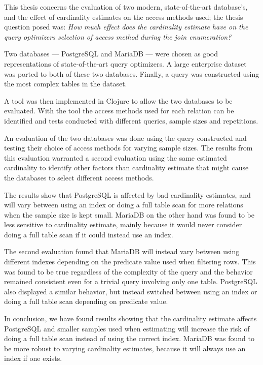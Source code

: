 This thesis concerns the evaluation of two modern, state-of-the-art database's,
and the effect of cardinality estimates on the access methods used; the thesis
question posed was:
\textit{How much effect does the cardinality estimate have on the query optimizers
  selection of access method during the join enumeration?}

Two databases --- PostgreSQL and MariaDB --- were chosen as good representations of
state-of-the-art query optimizers. A large enterprise dataset was ported to both
of these two databases. Finally, a query was constructed using the most complex
tables in the dataset.

A tool was then implemented in Clojure to allow the two databases to be
evaluated. With the tool the access methods used for each relation can be
identified and tests conducted with different queries, sample sizes and
repetitions.

An evaluation of the two databases was done using the query constructed and
testing their choice of access methods for varying sample sizes. The results
from this evaluation warranted a second evaluation using the same estimated
cardinality to identify other factors than cardinality estimate that might cause
the databases to select different access methods.

The results show that PostgreSQL is affected by bad cardinality estimates, and
will vary between using an index or doing a full table scan for more relations
when the sample size is kept small. MariaDB on the other hand was found to be
less sensitive to cardinality estimate, mainly because it would never consider
doing a full table scan if it could instead use an index.

The second evaluation found that MariaDB will instead vary between using
different indexes depending on the predicate value used when filtering rows.
This was found to be true regardless of the complexity of the query and the
behavior remained consistent even for a trivial query involving only one table.
PostgreSQL also displayed a similar behavior, but instead switched between using
an index or doing a full table scan depending on predicate value.

In conclusion, we have found results showing that the cardinality estimate
affects PostgreSQL and smaller samples used when estimating will increase the
risk of doing a full table scan instead of using the correct index. MariaDB was
found to be more robust to varying cardinality estimates, because it will always
use an index if one exists.